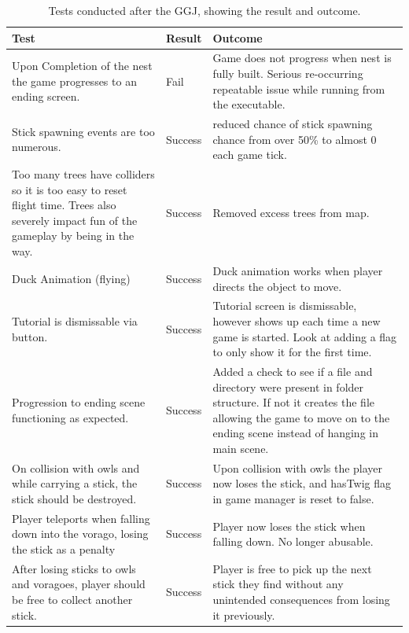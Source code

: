 \documentclass[12pt]{article}
\begin{document}
\begin{table}[H]
\centering
\begin{tabular}{| p{6cm} | p{1.5cm} | p{6cm} |}
     \hline
     \bf Test & \bf Result & \bf Outcome\\ \hline
     Upon Completion of the nest the game progresses to an ending screen. & Fail & Game does not progress when nest is fully built. Serious re-occurring repeatable issue while running from the executable. \\ \hline
     Stick spawning events are too numerous. & Success & reduced chance of stick spawning chance from over 50\% to almost 0 each game tick. \\ \hline
     Too many trees have colliders so it is too easy to reset flight time. Trees also severely impact fun of the gameplay by being in the way. & Success & Removed excess trees from map. \\ \hline
     Duck Animation (flying)& Success & Duck animation works when player directs the object to move. \\ \hline
     Tutorial is dismissable via button. & Success & Tutorial screen is dismissable, however shows up each time a new game is started. Look at adding a flag to only show it for the first time.\\ \hline
     Progression to ending scene functioning as expected.& Success & Added a check to see if a file and directory were present in folder structure. If not it creates the file allowing the game to move on to the ending scene instead of hanging in main scene.\\ \hline
     On collision with owls and while carrying a stick, the stick should be destroyed.& Success & Upon collision with owls the player now loses the stick, and hasTwig flag in game manager is reset to false. \\ \hline
     Player teleports when falling down into the vorago, losing the stick as a penalty& Success& Player now loses the stick when falling down. No longer abusable.\\ \hline     
     After losing sticks to owls and voragoes, player should be free to collect another stick.& Success & Player is free to pick up the next stick they find without any unintended consequences from losing it previously. \\ \hline
\end{tabular}
\caption{Tests conducted after the GGJ, showing the result and outcome.}
\label{tab:postggjtestingtable}
\end{table}
\end{document}

